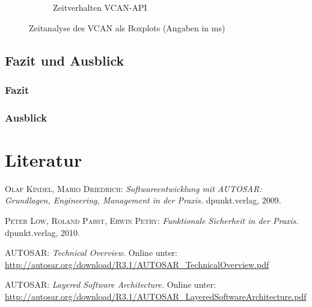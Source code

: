 \documentclass[draft]{beamer}
\begin{document}
\begin{frame}
\begin{figure}
\begin{subfigure}[b]{0.49\textwidth}
            \caption{Zeitverhalten VCAN-API}
            \label{fig:boxplot_vcan}
        \end{subfigure}
        \caption[Zeitanalyse des VCAN als Boxplots]{Zeitanalyse des VCAN als Boxplots (Angaben in ms)}
        \label{fig:timinganalyse}
    \end{figure}
\end{frame}



\subsection{Fazit und Ausblick}
\begin{frame}
\frametitle{Fazit}

\end{frame}


\begin{frame}
\frametitle{Ausblick}

\end{frame}










\appendix
\section*{Literatur}
\label{sec:Literatur}

\begin{frame}


\begin{thebibliography}{10}

 \textsc{Olaf Kindel, Mario Driedrich}: {\em Softwareentwicklung mit AUTOSAR: Grundlagen, Engineering, Management in der Praxis.} dpunkt.verlag, 2009.

 \textsc{Peter Löw, Roland Pabst, Erwin Petry}: {\em Funktionale Sicherheit in der Praxis.} dpunkt.verlag, 2010.

 \textsc{AUTOSAR}: {\em Technical Overview.} Online unter: \url{http://autosar.org/download/R3.1/AUTOSAR_TechnicalOverview.pdf}

 \textsc{AUTOSAR}: {\em Layered Software Architecture.} Online unter: \url{http://autosar.org/download/R3.1/AUTOSAR_LayeredSoftwareArchitecture.pdf}

\end{thebibliography}


\end{frame}
\end{document}
